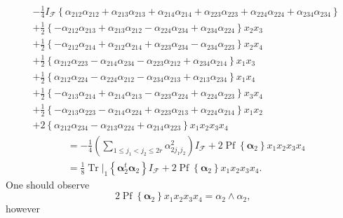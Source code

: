\documentclass[aps, preprint]{revtex4}
\begin{document}
\begin{align} &  -\frac{1}{4} I_{\mathcal{F}} \left \{\alpha _{2 1 2} \alpha _{2 1 2} +\alpha _{2 1 3} \alpha _{2 1 3} +\alpha _{2 1 4} \alpha _{2 1 4} +\alpha _{2 2 3} \alpha _{2 2 3} +\alpha _{2 2 4} \alpha _{2 2 4} +\alpha _{2 3 4} \alpha _{2 3 4}\right \} \nonumber  \\
 &  +\frac{1}{2} \left \{ -\alpha _{2 1 2} \alpha _{2 1 3} +\alpha _{2 1 3} \alpha _{2 1 2} -\alpha _{2 2 4} \alpha _{2 3 4} +\alpha _{2 3 4} \alpha _{2 2 4}\right \} x_{2} x_{3} \nonumber  \\
 &  +\frac{1}{2} \left \{ -\alpha _{2 1 2} \alpha _{2 1 4} +\alpha _{2 1 2} \alpha _{2 1 4} +\alpha _{2 2 3} \alpha _{2 3 4} -\alpha _{2 3 4} \alpha _{2 2 3}\right \} x_{2} x_{4} \nonumber  \\
 &  +\frac{1}{2} \left \{\alpha _{2 1 2} \alpha _{2 2 3} -\alpha _{2 1 4} \alpha _{2 3 4} -\alpha _{2 2 3} \alpha _{2 1 2} +\alpha _{2 3 4} \alpha _{2 1 4}\right \} x_{1} x_{3} \nonumber  \\
 &  +\frac{1}{2} \left \{\alpha _{2 1 2} \alpha _{2 2 4} -\alpha _{2 2 4} \alpha _{2 1 2} -\alpha _{2 3 4} \alpha _{2 1 3} +\alpha _{2 1 3} \alpha _{2 3 4}\right \} x_{1} x_{4} \nonumber  \\
 &  +\frac{1}{2} \left \{ -\alpha _{2 1 3} \alpha _{2 1 4} +\alpha _{2 1 4} \alpha _{2 1 3} -\alpha _{2 2 3} \alpha _{2 2 4} +\alpha _{2 2 4} \alpha _{2 2 3}\right \} x_{3} x_{4} \nonumber  \\
 &  +\frac{1}{2} \left \{ -\alpha _{2 1 3} \alpha _{2 2 3} -\alpha _{2 1 4} \alpha _{2 2 4} +\alpha _{2 2 3} \alpha _{2 1 3} +\alpha _{2 2 4} \alpha _{2 1 4}\right \} x_{1} x_{2} \nonumber  \\
 &  +2 \left \{\alpha _{2 1 2} \alpha _{2 3 4} -\alpha _{2 1 3} \alpha _{2 2 4} +\alpha _{2 1 4} \alpha _{2 2 3}\right \} x_{1} x_{2} x_{3} x_{4}\end{align}
\begin{align} &  = -\frac{1}{4} \left (\sum _{1 \leq j_{1} <j_{2} \leq 2 r}\alpha _{2 j_{1} j_{2}}^{2}\right ) I_{\mathcal{F}} +2 \ensuremath{\operatorname*{Pf}}\left \{\mathbf{\alpha }_{2}\right \} x_{1} x_{2} x_{3} x_{4} \nonumber  \\
 &  =\frac{1}{8} \left .\ensuremath{\operatorname*{Tr}}\right \vert _{1} \left \{\mathbf{\alpha }_{2}^{t} \mathbf{\alpha }_{2}\right \} I_{\mathcal{F}} +2 \ensuremath{\operatorname*{Pf}}\left \{\mathbf{\alpha }_{2}\right \} x_{1} x_{2} x_{3} x_{4}\text{.}\end{align}One should observe
\begin{equation}2 \ensuremath{\operatorname*{Pf}}\left \{\mathbf{\alpha }_{2}\right \} x_{1} x_{2} x_{3} x_{4} =\alpha _{2} \wedge \alpha _{2}\text{,}
\end{equation}however
\end{document}
